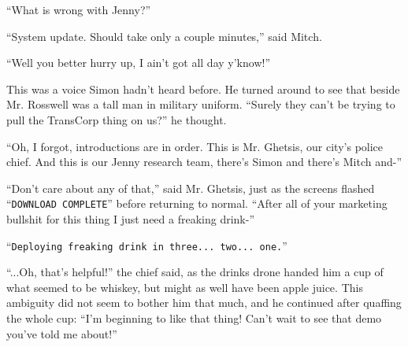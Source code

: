 \documentclass[10pt,a4paper]{article}
\newcommand{\lang}[2]{ #2 \par}
\newcommand{\ai}[2]{
	\lang{
		-- \texttt{#1}
	}{
		``\texttt{#2}''
	}
}
\newcommand{\ainame}{Jenny}
\newcommand{\mainname}{Simon}
\newcommand{\auxname}{Mitch}
\newcommand{\ceoname}{Mr. Rosswell}
\newcommand{\policename}{Mr. Ghetsis}
\begin{document}
\lang{-- Что не так с \ainame{}? }{``What is wrong with \ainame{}?''}

\lang{-- Обновление системы. Займёт всего пару минут.}{``System update. Should take only a couple minutes,'' said \auxname{}.}

\lang{-- А побыстрее никак? Я тут не могу весь день ждать!}{``Well you better hurry up, I ain't got all day y'know!''}

\lang{Этот голос не был знаком \mainname{}. Он посмотрел в сторону двери и увидел рядом с \ceoname{} высокого мужчину в военной форме. ``Они что, правда собираются делать как в TransCorp?'' подумал он.}{This was a voice \mainname{} hadn't heard before. He turned around to see that beside \ceoname{} was a tall man in military uniform. ``Surely they can't be trying to pull the TransCorp thing on us?'' he thought.}

\lang{-- Ах да, совсем забыл, нам необходимо представиться. Это \policename{}, начальник полиции нашего города. А это -- наша команда разрабоки \ainame{}, это \mainname{}, это \auxname{}-}{``Oh, I forgot, introductions are in order. This is \policename{}, our city's police chief. And this is our \ainame{} research team, there's \mainname{} and there's \auxname{} and-''}

\lang{-- Вот ваще не интересует, -- сказал \policename{}, и в этот момент все экраны показали ``\texttt{ЗАГРУЗКА ЗАВЕРШЕНА}'' и вернулись к обычному виду, -- После всей этой рекламной чуши мне очень нужен грёбанный напиток-}{``Don't care about any of that,'' said \policename{}, just as the screens flashed ``\texttt{DOWNLOAD COMPLETE}'' before returning to normal. ``After all of your marketing bullshit for this thing I just need a freaking drink-''}

\ai{Грёбанный напиток будет выдан через три... два... один.}{Deploying freaking drink in three... two... one.}

\lang{-- ...А вот это полезно! -- сказал полицейский, а дрон в это время дал ему стакан чего-то, что похоже на виски, но вполне могло бы быть и яблочным соком. Неоднозначность эта его не смутила, и, залпом выпив неизвестный напиток, он продолжил: -- Мне эта штука начинает нравится! Теперь мне уже хочется посмотреть ту обещанную демонстрацию!}{``...Oh, that's helpful!'' the chief said, as the drinks drone handed him a cup of what seemed to be whiskey, but might as well have been apple juice. This ambiguity did not seem to bother him that much, and he continued after quaffing the whole cup: ``I'm beginning to like that thing! Can't wait to see that demo you've told me about!''}
\end{document}
